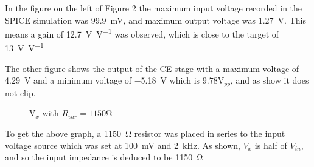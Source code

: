 \documentclass[12pt]{article}
\begin{document}
In the figure on the left of Figure 2 the maximum input voltage recorded in the SPICE simulation was \SI{99.9}{\milli\volt}, and maximum output voltage was \SI{1.27}{\volt}. This means a gain of \SI[per-mode=symbol]{12.7}{\volt\per\volt} was observed, which is close to the target of \SI[per-mode=symbol]{13}{\volt\per\volt}

The other figure shows the output of the CE stage with a maximum voltage of \SI{4.29}{\volt} and a minimum voltage of \SI{-5.18}{\volt} which is \(9.78 \si{\volt}_{pp}\), and as show it does not clip.

    \begin{figure}[H]
    \centering
    \caption{\(\si{\volt}_x\) with \(R_{var} = 1150\si{\ohm}\)}
    \label{grph:ceimpede}
    \end{figure}
    
To get the above graph, a \SI{1150}{\ohm} resistor was placed in series to the input voltage source which was set at \SI{100}{\milli\volt} and \SI{2}{\kilo\hertz}. As shown, \(V_x\) is half of \(V_{in}\), and so the input impedance is deduced to be \SI{1150}{\ohm}


\begin{figure}[H]
    \centering
\end{figure}
\end{document}
